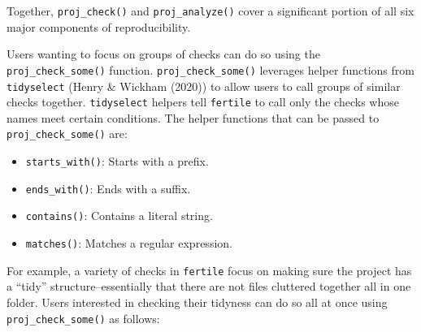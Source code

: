 \documentclass[12pt,twoside]{reedthesis}
\providecommand{\tightlist}{%
  \setlength{\itemsep}{0pt}\setlength{\parskip}{0pt}}
\begin{document}
Together, \texttt{proj\_check()} and \texttt{proj\_analyze()} cover a
significant portion of all six major components of reproducibility.

Users wanting to focus on groups of checks can do so using the
\texttt{proj\_check\_some()} function. \texttt{proj\_check\_some()}
leverages helper functions from \texttt{tidyselect} (Henry \& Wickham
(2020)) to allow users to call groups of similar checks together.
\texttt{tidyselect} helpers tell \texttt{fertile} to call only the
checks whose names meet certain conditions. The helper functions that
can be passed to \texttt{proj\_check\_some()} are:
\begin{itemize}
\tightlist
\item
  \texttt{starts\_with()}: Starts with a prefix.
\item
  \texttt{ends\_with()}: Ends with a suffix.
\item
  \texttt{contains()}: Contains a literal string.
\item
  \texttt{matches()}: Matches a regular expression.
\end{itemize}
For example, a variety of checks in \texttt{fertile} focus on making
sure the project has a ``tidy'' structure--essentially that there are
not files cluttered together all in one folder. Users interested in
checking their tidyness can do so all at once using
\texttt{proj\_check\_some()} as follows:
\end{document}
